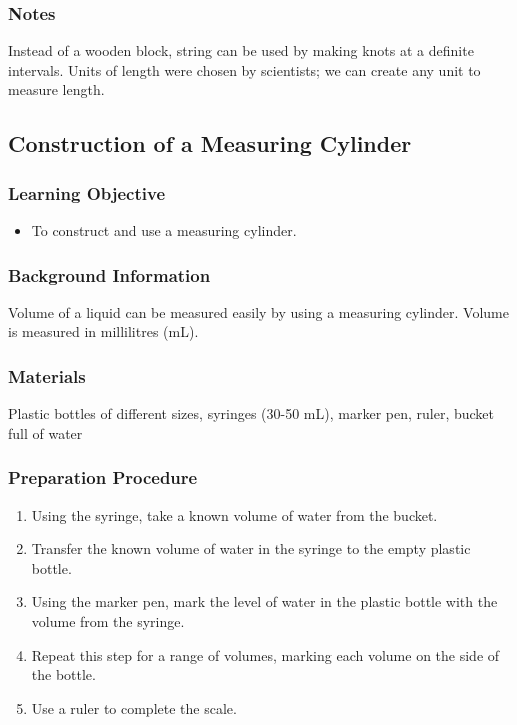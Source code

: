 \subsubsection*{Notes}
Instead of a wooden block, string can be used by making knots at a definite intervals.  Units of length were chosen by scientists; we can create any unit to measure length.


\subsection{Construction of a Measuring Cylinder}

\subsubsection*{Learning Objective}
\begin{itemize}
\item{To construct and use a measuring cylinder.} 
\end{itemize}

\subsubsection*{Background Information}
Volume of a liquid can be measured easily by using a measuring cylinder.  Volume is measured in millilitres (mL).

\subsubsection*{Materials}
Plastic bottles of different sizes, syringes (30-50 mL), marker pen, ruler, bucket full of water

\subsubsection*{Preparation Procedure}
\begin{enumerate}
\item{Using the syringe, take a known volume of water from the bucket.} 
\item{Transfer the known volume of water in the syringe to the empty plastic bottle.} 
\item{Using the marker pen, mark the level of water in the plastic bottle with the volume from the syringe.}
\item{Repeat this step for a range of volumes, marking each volume on the side of the bottle.}
\item{Use a ruler to complete the scale.} 
\end{enumerate}

